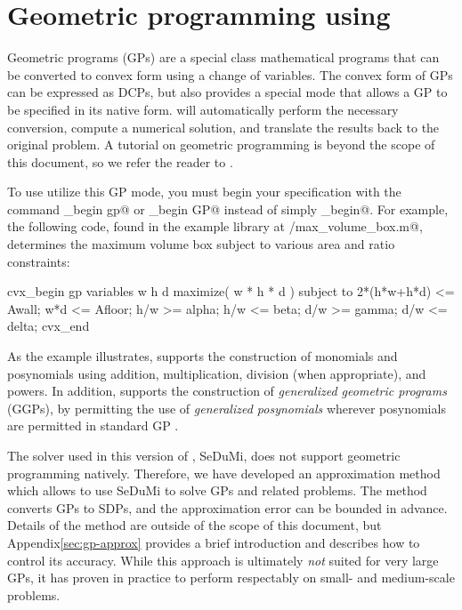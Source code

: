 \documentclass[12pt]{article}
\begin{document}
\section{Geometric programming using \cvx}
\label{sec:gpmode}

Geometric programs (GPs) are a special class mathematical programs 
that can be converted to convex form using a change of variables.
The convex form of GPs can be expressed as DCPs, but \cvx also 
provides a special mode that allows a GP to be specified in 
its native form. \cvx will automatically perform the necessary
conversion, compute a numerical solution, and translate the results
back to the original problem.
A tutorial on geometric programming is beyond the scope of this document, so we
refer the reader to \cite{BKVH:05}.

To use utilize this GP mode, you must begin your \cvx specification
with the command \verb@cvx_begin gp@ or \verb@cvx_begin GP@ instead of simply
\verb@cvx_begin@. For example,
the following code, found in the example library at \verb@gp/max_volume_box.m@,
determines the maximum volume box subject to
various area and ratio constraints:
\begin{code}
	cvx_begin gp
	    variables w h d
	    maximize( w * h * d )
	    subject to
	        2*(h*w+h*d) <= Awall;
	        w*d <= Afloor;
	        h/w >= alpha;
	        h/w <= beta;
	        d/w >= gamma;
	        d/w <= delta;
	cvx_end
\end{code}
As the example illustrates, \cvx supports the construction of monomials and
posynomials using addition, multiplication, division (when appropriate),
and powers. In addition, \cvx supports the construction of \emph{generalized
geometric programs} (GGPs), by permitting the use of \emph{generalized
posynomials} wherever posynomials are permitted in standard GP \cite{BKVH:05}.

The solver used in this version of \cvx, SeDuMi, does
not support geometric programming natively. Therefore, we have developed an
approximation method which allows \cvx to use SeDuMi to solve GPs and related
problems. The method converts GPs to SDPs, and the approximation error can be bounded in advance.
Details of the method are outside of the scope of this document,
but Appendix\ref{sec:gp-approx} provides a brief introduction  and describes
how to control its accuracy. While this approach
is ultimately \emph{not} suited for very large GPs, it has proven
in practice to perform respectably on small- and medium-scale
problems.
\end{document}
